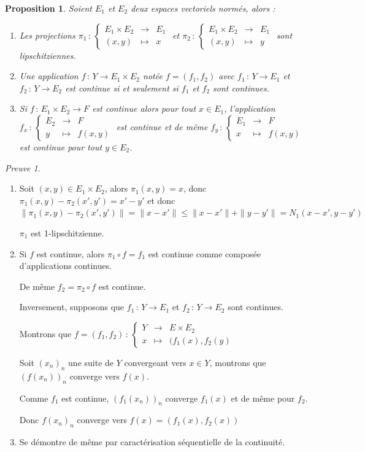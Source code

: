 \documentclass[]{article}
\newtheorem{myproposition}{Proposition}
\theoremstyle{remark}
\newtheorem{myproof}{Preuve}
\theoremstyle{definition}
\newcommand{\func}[5]{
#1 \, : \, \left\{ \begin{array}{lcl}
	#2 & \longrightarrow & #3 \\
	#4 & \longmapsto & #5
\end{array}
\right.
}
\newcommand{\funcshort}[3]{
#1 \, : \, #2 \longrightarrow #3
}
\begin{document}
\begin{myproposition}
	Soient $E_1$ et $E_2$ deux espaces vectoriels normés, alors :
	
	\begin{enumerate}
		\item Les projections $\func{\pi_1}{E_1 \times E_2}{E_1}{(x,y)}{x}$
		et $\func{\pi_2}{E_1 \times E_2}{E_1}{(x,y)}{y}$
		sont lipschitziennes.
		
		\item Une application $\funcshort{f}{Y}{E_1 \times E_2}$ notée $f=(f_1, f_2)$ avec $\funcshort{f_1}{Y}{E_1}$ et $\funcshort{f_2}{Y}{E_2}$ est continue si et seulement si $f_1$ et $f_2$ sont continues.
		
		\item Si $\funcshort{f}{E_1 \times E_2}{F}$ est continue alors pour tout $x \in E_1$, l'application $\func{f_x}{E_2}{F}{y}{f(x, y)}$ est continue et de même $\func{f_y}{E_1}{F}{x}{f(x, y)}$ est continue pour tout $y \in E_2$.
	\end{enumerate}
\end{myproposition}

\begin{myproof}
	\begin{enumerate}
		\item Soit $(x, y) \in E_1 \times E_2$, alors $\pi_1(x, y) = x$, donc $\pi_1(x,y) - \pi_2(x',y')=x'-y'$ et donc $\|\pi_1(x,y) - \pi_2(x',y')\| = \|x-x'\| \leqslant \|x-x'\| + \|y-y'\| = N_1(x-x', y-y')$
		
		$\pi_1$ est 1-lipschitzienne.
		
		\item Si $f$ est continue, alors $\pi_1 \circ f=f_1$ est continue comme composée d'applications continues.
		
		De même $f_2=\pi_2 \circ f$ est continue.
		
		Inversement, supposons que $\funcshort{f_1}{Y}{E_1}$ et $\funcshort{f_2}{Y}{E_2}$ sont continues.
		
		Montrons que $\func{f=(f_1, f_2)}{Y}{E \times E_2}{x}{(f_1(x), f_2(y)}$
		
		Soit $(x_n)_n$ une suite de $Y$ convergeant vers $x \in Y$, montrons que $(f(x_n))_n$ converge vers $f(x)$.
		
		Comme $f_1$ est continue, $(f_1(x_n))_n$ converge $f_1(x)$ et de même pour $f_2$.
		
		Donc $f(x_n)_n$ converge vers $f(x)=(f_1(x), f_2(x))$
		
		\item Se démontre de même par caractérisation séquentielle de la continuité.
	\end{enumerate}
\end{myproof}
\end{document}
